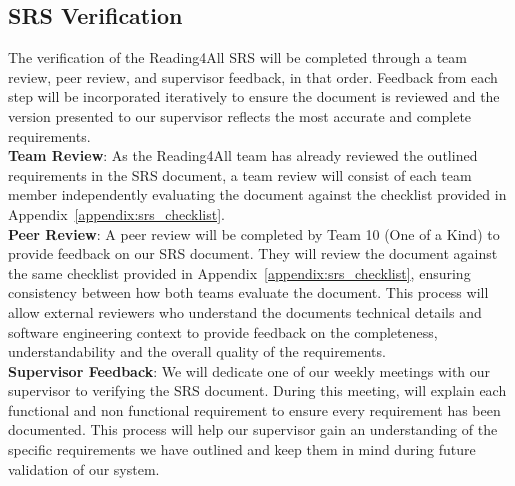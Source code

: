 \documentclass[12pt, titlepage]{article}
\begin{document}
  
\subsection{SRS Verification}



The verification of the Reading4All SRS will be completed
 through a team review, peer review, and supervisor feedback, in that order. 
 Feedback from each step will be incorporated iteratively to ensure the document is reviewed and the version presented to our supervisor reflects the most accurate and complete requirements. \\

\textbf{Team Review}:
As the Reading4All team has already reviewed the outlined
requirements in the SRS document, a team review will
consist of each team member independently evaluating the document
against the checklist provided in Appendix~\ref{appendix:srs_checklist}.   \\

\textbf{Peer Review}:
A peer review will be completed by Team 10 (One of a Kind) to provide
feedback on our SRS document.
They will review the document against the same checklist provided in
Appendix~\ref{appendix:srs_checklist}, ensuring consistency between
how both teams evaluate the document.
This process will allow external reviewers who understand the
documents technical details and software engineering context to
provide feedback on the completeness, understandability and the
overall quality of the requirements. \\

\textbf{Supervisor Feedback}:
We will dedicate one of our weekly meetings with our supervisor to
verifying the SRS document.
During this meeting, will explain each functional and non functional
requirement to ensure every requirement has been documented.
This process will help our supervisor gain an understanding of the
specific requirements we have outlined and keep them in
mind during future validation of our system. \\
\end{document}
